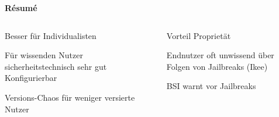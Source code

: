 \begin{frame}
	\centering
	\textbf{Résumé}
	\begin{columns}
		\begin{column}[T]{5cm} %
			\begin{block}{}
				Besser für Individualisten
			\end{block}{}
			\begin{block}{}
				Für wissenden Nutzer sicherheitstechnisch sehr gut Konfigurierbar
			\end{block}
			\begin{block}{}
				Versions-Chaos für weniger versierte Nutzer
			\end{block}
		\end{column}

		\begin{column}[T]{5cm} %
				\begin{block}{}
					Vorteil Proprietät
				\end{block}
				\begin{block}{}
					Endnutzer oft unwissend über Folgen von Jailbreaks (Ikee)
				\end{block}
				\begin{block}{}
					BSI warnt vor Jailbreaks
				\end{block}
		\end{column}	
		\end{columns}
\end{frame}